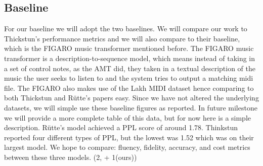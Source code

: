 \documentclass[11pt]{article}
\begin{document}
\subsection{Baseline}
For our baseline we will adopt the two baselines. We will compare our work to Thickstun's performance metrics and we will also compare to their baseline, which is the FIGARO music transformer mentioned before. The FIGARO music transformer is a description-to-sequence model, which means instead of taking in a set of control notes, as the AMT did, they taken in a textual description of the music the user seeks to listen to and the system tries to output a matching midi file. The FIGARO also makes use of the Lakh MIDI dataset hence comparing to both Thickstun and R{\"{u}}tte's papers easy. Since we have not altered the underlying datasets, we will simple use these baseline figures as reported. In future milestone we will provide a more complete table of this data, but for now here is a simple description. R{\"{u}}tte's model achieved a PPL score of around 1.78. Thinkstun reported four different types of PPL, but the lowest was 1.52 which was on their largest model. We hope to compare: fluency, fidelity, accuracy, and cost metrics between these three models. (2, + 1(ours))













\appendix

\end{document}
